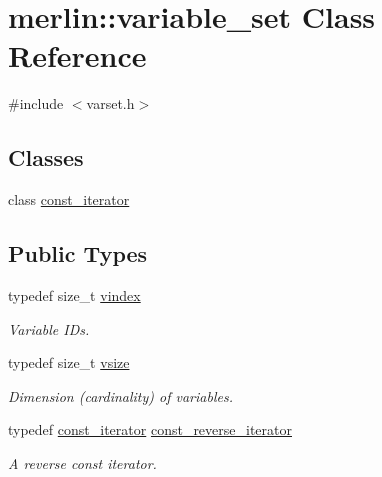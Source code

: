 \hypertarget{classmerlin_1_1variable__set}{}\section{merlin\+:\+:variable\+\_\+set Class Reference}
\label{classmerlin_1_1variable__set}


{\ttfamily \#include $<$varset.\+h$>$}

\subsection*{Classes}
\begin{DoxyCompactItemize}
\item 
class \hyperlink{classmerlin_1_1variable__set_1_1const__iterator}{const\+\_\+iterator}
\end{DoxyCompactItemize}
\subsection*{Public Types}
\begin{DoxyCompactItemize}
\item 
\hypertarget{classmerlin_1_1variable__set_a2dadc030390168fc0656308250716634}{}typedef size\+\_\+t \hyperlink{classmerlin_1_1variable__set_a2dadc030390168fc0656308250716634}{vindex}\label{classmerlin_1_1variable__set_a2dadc030390168fc0656308250716634}

\begin{DoxyCompactList}\small\item\em Variable I\+Ds. \end{DoxyCompactList}\item 
\hypertarget{classmerlin_1_1variable__set_a05d7a8291564fa7fb236a5e9cb65c734}{}typedef size\+\_\+t \hyperlink{classmerlin_1_1variable__set_a05d7a8291564fa7fb236a5e9cb65c734}{vsize}\label{classmerlin_1_1variable__set_a05d7a8291564fa7fb236a5e9cb65c734}

\begin{DoxyCompactList}\small\item\em Dimension (cardinality) of variables. \end{DoxyCompactList}\item 
\hypertarget{classmerlin_1_1variable__set_a4d523eb96935f7215e5b6f2e968f7f0a}{}typedef \hyperlink{classmerlin_1_1variable__set_1_1const__iterator}{const\+\_\+iterator} \hyperlink{classmerlin_1_1variable__set_a4d523eb96935f7215e5b6f2e968f7f0a}{const\+\_\+reverse\+\_\+iterator}\label{classmerlin_1_1variable__set_a4d523eb96935f7215e5b6f2e968f7f0a}

\begin{DoxyCompactList}\small\item\em A reverse const iterator. \end{DoxyCompactList}\end{DoxyCompactItemize}
